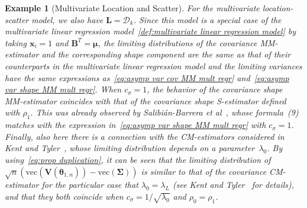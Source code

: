 \documentclass{article}
\numberwithin{equation}{section}
\theoremstyle{plain}
\newtheorem{example}{Example}
\newcommand{\vc}{\mathrm{vec}}
\newcommand{\btheta}{\bm\theta}
\newcommand{\bmu}{\bm\mu}
\newcommand{\bSigma}{\mathbf{\Sigma}}
\newcommand{\bx}{\mathbf{x}}
\newcommand{\bV}{\mathbf{V}}
\newcommand{\bB}{\mathbf{B}}
\newcommand{\bL}{\mathbf{L}}
\begin{document}
\begin{example}[Multivariate Location and Scatter]
For the multivariate location-scatter model, we also have $\bL=\mathcal{D}_k$.
Since this model is a special case of the multivariate linear regression model~\eqref{def:multivariate linear regression model}
by taking $\bx_i=1$ and $\bB^T=\bmu$,
the limiting distributions of the covariance MM-estimator and the corresponding shape component 
are the same as that of their counterparts in the multivariate linear regression model
and the limiting variances have the same expressions as~\eqref{eq:asymp var cov MM mult regr}
and~\eqref{eq:asymp var shape MM mult regr}.
When $c_\sigma=1$, the behavior of the covariance shape MM-estimator 
coincides with that of the covariance shape S-estimator defined with $\rho_1$.
This was already observed by Salibi\'an-Barrera \emph{et al}~\cite{SalibianBarrera-VanAelst-Willems2006},
whose formula~(9) matches with the expression in~\eqref{eq:asymp var shape MM mult regr} with $c_\sigma=1$.
Finally, also here there is a connection with the CM-estimators considered in 
Kent and Tyler~\cite{kent&tyler1996},
whose limiting distribution depends on a parameter~$\lambda_0$.
By using~\eqref{eq:prop duplication}, it can be seen that the limiting distribution 
of $\sqrt{n}(\vc(\bV(\btheta_{1,n}))-\vc(\bSigma))$ is similar to that of 
the covariance CM-estimator for the particular case that $\lambda_0=\lambda_L$ (see Kent and Tyler~\cite{kent&tyler1996} for details),
and that they both coincide when $c_\sigma=1/\sqrt{\lambda_0}$ and $\rho_0=\rho_1$.
\end{example}
\end{document}
